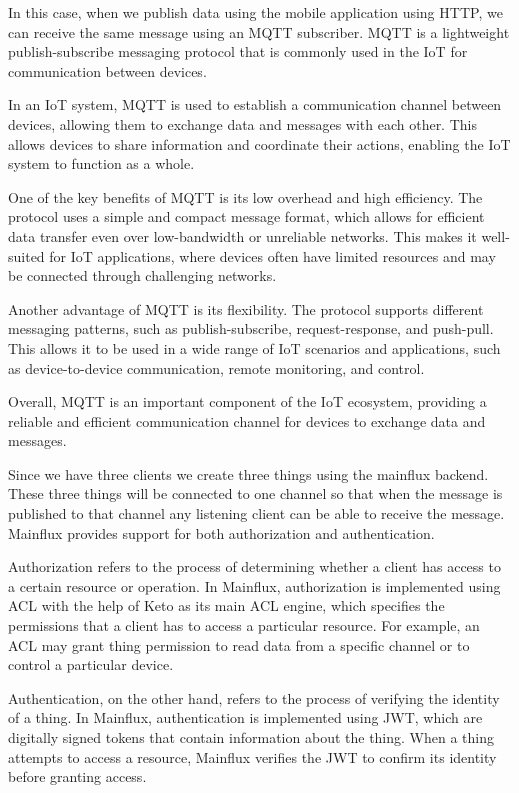 In this case, when we publish data using the mobile application using \ac{HTTP}, we can receive the same message using an \ac{MQTT} subscriber. \ac{MQTT} is a lightweight publish-subscribe messaging protocol that is commonly used in the \ac{IoT} for communication between devices.

In an \ac{IoT} system, \ac{MQTT} is used to establish a communication channel between devices, allowing them to exchange data and messages with each other. This allows devices to share information and coordinate their actions, enabling the \ac{IoT} system to function as a whole.

One of the key benefits of \ac{MQTT} is its low overhead and high efficiency. The protocol uses a simple and compact message format, which allows for efficient data transfer even over low-bandwidth or unreliable networks. This makes it well-suited for \ac{IoT} applications, where devices often have limited resources and may be connected through challenging networks.

Another advantage of \ac{MQTT} is its flexibility. The protocol supports different messaging patterns, such as publish-subscribe, request-response, and push-pull. This allows it to be used in a wide range of \ac{IoT} scenarios and applications, such as device-to-device communication, remote monitoring, and control.

Overall, \ac{MQTT} is an important component of the \ac{IoT} ecosystem, providing a reliable and efficient communication channel for devices to exchange data and messages.

Since we have three clients we create three things using the mainflux backend. These three things will be connected to one channel so that when the message is published to that channel any listening client can be able to receive the message. Mainflux provides support for both authorization and authentication.

Authorization refers to the process of determining whether a client has access to a certain resource or operation. In Mainflux, authorization is implemented using \ac{ACL} with the help of Keto as its main \ac{ACL} engine, which specifies the permissions that a client has to access a particular resource. For example, an \ac{ACL} may grant thing permission to read data from a specific channel or to control a particular device.

Authentication, on the other hand, refers to the process of verifying the identity of a thing. In Mainflux, authentication is implemented using \ac{JWT}, which are digitally signed tokens that contain information about the thing. When a thing attempts to access a resource, Mainflux verifies the \ac{JWT} to confirm its identity before granting access.


